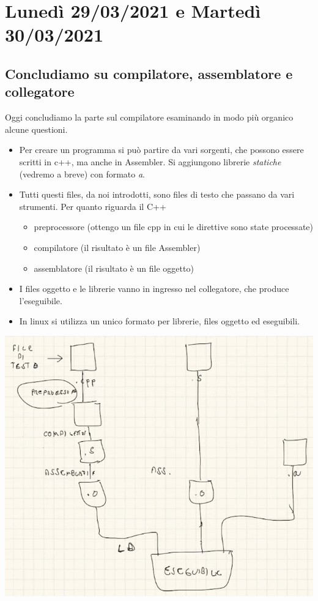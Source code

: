 
\chapter{Lunedì 29/03/2021 e Martedì 30/03/2021}
\section{Concludiamo su compilatore, assemblatore e collegatore} 
Oggi concludiamo la parte sul compilatore esaminando in modo più organico alcune questioni.
\begin{itemize}
	\item Per creare un programma si può partire da vari sorgenti, che possono essere scritti in c++, ma anche in Assembler. Si aggiungono librerie \emph{statiche} (vedremo a breve) con formato \emph{a}. 
	\item Tutti questi files, da noi introdotti, sono files di testo che passano da vari strumenti. Per quanto riguarda il C++
	\begin{itemize}
		\item preprocessore (ottengo un file cpp in cui le direttive sono state processate)
		\item compilatore (il risultato è un file Assembler)
		\item assemblatore (il risultato è un file oggetto)
	\end{itemize}
	\item I files oggetto e le librerie vanno in ingresso nel collegatore, che produce l'eseguibile.
	\item In linux si utilizza un unico formato per librerie, files oggetto ed eseguibili.
\end{itemize}\begin{center}
	\includegraphics[scale=0.62]{img/50.PNG}
\end{center}  
